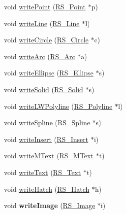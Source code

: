 \begin{DoxyCompactItemize}
\item 
void \hyperlink{classRS__FilterDXFRW_aac274e20bca514b4624bb7eda084492c}{write\-Point} (\hyperlink{classRS__Point}{R\-S\-\_\-\-Point} $\ast$p)
\item 
void \hyperlink{classRS__FilterDXFRW_ac2a4319207ec68b189a04fbb88384a08}{write\-Line} (\hyperlink{classRS__Line}{R\-S\-\_\-\-Line} $\ast$l)
\item 
void \hyperlink{classRS__FilterDXFRW_af7b4fc65f68b58667b57d2ca77769733}{write\-Circle} (\hyperlink{classRS__Circle}{R\-S\-\_\-\-Circle} $\ast$c)
\item 
void \hyperlink{classRS__FilterDXFRW_aabd5cc82298bd12c46e5941d6627bdeb}{write\-Arc} (\hyperlink{classRS__Arc}{R\-S\-\_\-\-Arc} $\ast$a)
\item 
void \hyperlink{classRS__FilterDXFRW_a5d81f9b37683c167b4af0568f8a98906}{write\-Ellipse} (\hyperlink{classRS__Ellipse}{R\-S\-\_\-\-Ellipse} $\ast$s)
\item 
void \hyperlink{classRS__FilterDXFRW_aec29d7f7d30e9f6658407419785bdbe0}{write\-Solid} (\hyperlink{classRS__Solid}{R\-S\-\_\-\-Solid} $\ast$s)
\item 
void \hyperlink{classRS__FilterDXFRW_ad7fb8c8a0a56d131dd9d16da94f6d3ec}{write\-L\-W\-Polyline} (\hyperlink{classRS__Polyline}{R\-S\-\_\-\-Polyline} $\ast$l)
\item 
void \hyperlink{classRS__FilterDXFRW_a77eda418343f9b564364281e0045d8ba}{write\-Spline} (\hyperlink{classRS__Spline}{R\-S\-\_\-\-Spline} $\ast$s)
\item 
void \hyperlink{classRS__FilterDXFRW_ad9622559a3b63a59d7038b30311c0e89}{write\-Insert} (\hyperlink{classRS__Insert}{R\-S\-\_\-\-Insert} $\ast$i)
\item 
void \hyperlink{classRS__FilterDXFRW_a84dc2d8dbe766932d38dc9517ce49760}{write\-M\-Text} (\hyperlink{classRS__MText}{R\-S\-\_\-\-M\-Text} $\ast$t)
\item 
void \hyperlink{classRS__FilterDXFRW_a92866d3fe973ff2470f31524317c9f95}{write\-Text} (\hyperlink{classRS__Text}{R\-S\-\_\-\-Text} $\ast$t)
\item 
void \hyperlink{classRS__FilterDXFRW_a897f764037db4a28ae3ae29783658b41}{write\-Hatch} (\hyperlink{classRS__Hatch}{R\-S\-\_\-\-Hatch} $\ast$h)
\item 
\hypertarget{classRS__FilterDXFRW_a0f30a8f87e81857b4c9d623f542439af}{void {\bfseries write\-Image} (\hyperlink{classRS__Image}{R\-S\-\_\-\-Image} $\ast$i)}\label{classRS__FilterDXFRW_a0f30a8f87e81857b4c9d623f542439af}


\end{DoxyCompactItemize}
